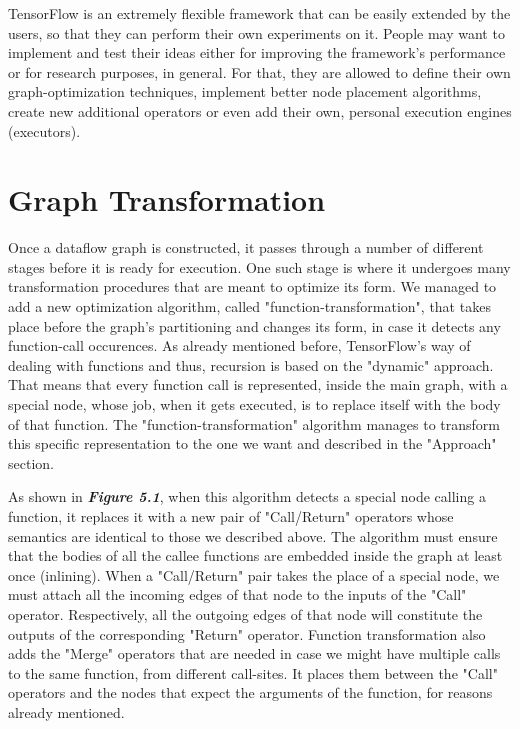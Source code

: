 \documentclass[ack,preface]{dithesis}
\begin{document}
TensorFlow is an extremely flexible framework that  can be easily extended by the users, so that they can perform their own experiments on it. People may want to implement and test their  ideas either for improving the framework's performance or for research purposes, in general. For that, they are allowed to define their own graph-optimization techniques, implement better node placement algorithms, create new additional operators or even add their own, personal execution engines (executors).

    \section{Graph Transformation}
Once a dataflow graph is constructed, it passes through a number of different stages before it is ready for execution. One such stage is where it undergoes many transformation procedures that are meant to optimize its form. We managed to add a new optimization algorithm, called "function-transformation", that takes place before the graph's partitioning and changes its form, in case it detects any function-call occurences.
As already mentioned before, TensorFlow's  way of dealing with functions and thus, recursion is based on the "dynamic" approach. That means that every function call is represented, inside the main graph, with a special node, whose job, when it gets executed, is to replace itself with the body of that function. The "function-transformation" algorithm  manages to transform this specific representation to the one we want and described in the "Approach" section. 

As shown in \textit{\textbf{Figure 5.1}}, when this algorithm detects a special node calling a function, it replaces it with a new pair of "Call/Return" operators whose semantics are identical to those we described above. The algorithm must ensure that the bodies of all the callee functions are embedded inside the graph at least once (inlining).
When a "Call/Return" pair takes the place of a special node, we must attach all the incoming edges of that node to the inputs of the "Call" operator. Respectively, all the outgoing edges of that node will constitute the outputs of the corresponding "Return" operator. Function transformation also adds the "Merge" operators that are needed in case we might have multiple calls to the same function, from different call-sites. It places them between the "Call" operators and the nodes that expect the arguments of the function, for reasons already mentioned.
\end{document}
